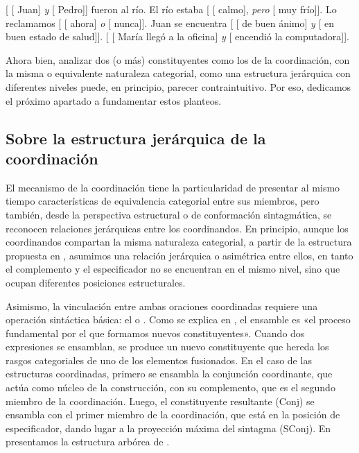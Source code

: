 \begin{exe}
  \ex\label{ex:12-an-juan} {}[ [ Juan] \textit{y}
      [ Pedro]] fueron al río.
  \ex\label{ex:12-an-rio} El río estaba [ [ calmo],
      \textit{pero} [ muy frío]].
  \ex Lo reclamamos [ [ ahora] \textit{o}
      [ nunca]].
  \ex Juan se encuentra [ [ de buen ánimo]
      \textit{y} [ en buen estado de salud]].
  \ex\label{ex:12-an-maria} {}[ [ María llegó a la
      oficina] \textit{y} [ encendió la computadora]].
\end{exe}

Ahora bien, analizar dos (o más) constituyentes como los de la coordinación, con
la misma o equivalente naturaleza categorial, como una estructura jerárquica con
diferentes niveles puede, en principio, parecer contraintuitivo. Por eso,
dedicamos el próximo apartado a fundamentar estos planteos.

\subsection{Sobre la estructura jerárquica de la coordinación}\label{sec:12-jerarquica}

El mecanismo de la coordinación tiene la particularidad de presentar al mismo
tiempo características de equivalencia categorial entre sus miembros, pero
también, desde la perspectiva estructural o de conformación sintagmática, se
reconocen relaciones jerárquicas entre los coordinandos. En principio, aunque los
coordinandos compartan la misma naturaleza categorial, a partir de la estructura
propuesta en , asumimos una relación jerárquica o asimétrica
entre ellos, en tanto el complemento y el especificador no se encuentran en el
mismo nivel, sino que ocupan diferentes posiciones estructurales.

Asimismo, la vinculación entre ambas oraciones coordinadas requiere una operación
sintáctica básica: el  o
. Como se explica en
\textcite[219]{bosque2009}, el ensamble es «el proceso fundamental por el que
formamos nuevos constituyentes». Cuando dos expresiones se ensamblan, se produce
un nuevo constituyente que hereda los rasgos categoriales de uno de los
elementos fusionados. En el caso de las estructuras coordinadas, primero se
ensambla la conjunción coordinante, que actúa como núcleo de la construcción, con
su complemento, que es el segundo miembro de la coordinación. Luego, el
constituyente resultante (Conj\prima) se ensambla con el primer miembro de la
coordinación, que está en la posición de especificador, dando lugar a la
proyección máxima del sintagma (SConj). En  presentamos
la estructura arbórea de .

